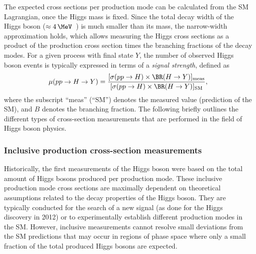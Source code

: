 The expected cross sections per production mode can be calculated from the SM Lagrangian, once the Higgs mass is fixed.
Since the total decay width of the Higgs boson ($\approx 4\,\MeV$~\cite{deFlorian:2016spz}) is much smaller than its mass, the narrow-width approximation holds, which allows measuring the Higgs cross sections as a product of the production cross section times the branching fractions of the decay modes.
For a given process with final state $Y$, the number of observed Higgs boson events is typically expressed in terms of a \emph{signal strength}, defined as 
\begin{equation}
  \label{eq:signal-strength}
  \mu(pp \to H \to Y) = \frac{ [ \sigma(pp \to H)  \times \BR(H \to Y) ]_\text{meas} } { [ \sigma(pp \to H) \times \BR(H \to Y) ]_\text{SM}},
\end{equation}
where the subscript ``meas'' (``SM'') denotes the measured value (prediction of the SM), and $B$ denotes the branching fraction. 
The following briefly outlines the different types of cross-section measurements that are performed in the field of Higgs boson physics. 


\subsubsection{Inclusive production cross-section measurements}
Historically, the first measurements of the Higgs boson were based on the total amount of Higgs bosons produced per production mode.
These inclusive production mode cross sections are maximally dependent on theoretical assumptions related to the decay properties of the Higgs boson.
They are typically conducted for the search of a new signal (as done for the Higgs discovery in 2012) or to experimentally establish different production modes in the SM.
However, inclusive measurements cannot resolve small deviations from the SM predictions that may occur in regions of phase space where only a small fraction of the total produced Higgs bosons are expected.

